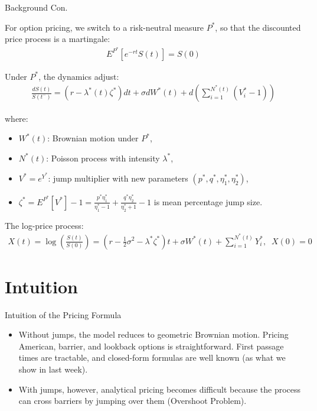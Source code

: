\documentclass{beamer}
\begin{document}
\begin{frame}{Background Con.}

    {\footnotesize \footnotesize
    \par For option pricing, we switch to a risk-neutral measure \( P^* \), so that the discounted price process is a martingale:
    \begin{align*}
        E^{P^*}[e^{-rt}S(t)] = S(0)
    \end{align*}
    \par Under \( P^* \), the dynamics adjust:
    \begin{align*}
        \frac{dS(t)}{S(t^-)} = (r - \lambda^*(t)\zeta^*)dt + \sigma dW^*(t) + d\left(\sum_{i=1}^{N^*(t)}(V_i^*-1)\right)
    \end{align*}
    \par \pause where:
    \begin{itemize}
        \item \( W^*(t) \): Brownian motion under \( P^* \),
        \item \( N^*(t) \): Poisson process with intensity \( \lambda^* \),
        \item \( V^* = e^{Y^*} \): jump multiplier with new parameters \( (p^*, q^*, \eta_1^*, \eta_2^*) \),
        \item \( \zeta^* = E^{P^*}[V^*] - 1 = \frac{p^{*}\eta_{1}^{*}}{\eta_{1}^{*}-1} + \frac{q^{*}\eta_{2}^{*}}{\eta_{2}^{*}+1} - 1\) is mean percentage jump size.
    \end{itemize}
    \par The log-price process:  
    \begin{align*}
        X(t) = \log\left(\frac{S(t)}{S(0)}\right) = \left(r - \frac{1}{2}\sigma^2 - 
    \lambda^*\zeta^*\right)t + \sigma W^*(t) + \sum_{i=1}^{N^*(t)} Y_i^*,\;\;X(0)=0
    \end{align*}
    }
    
    
\end{frame}


\section{Intuition}
\begin{frame}{Intuition of the Pricing Formula}

    \begin{itemize}
    \item Without jumps, the model reduces to geometric Brownian motion. Pricing American, 
    barrier, and lookback options is straightforward. First passage times are tractable, and 
    closed-form formulas are well known (as what we show in last week).
    \vspace{1em}
    \item  \pause With jumps, however, analytical pricing becomes difficult 
    because the process can cross barriers by jumping over them (Overshoot Problem).
\end{itemize}
    
\end{frame}
\end{document}

